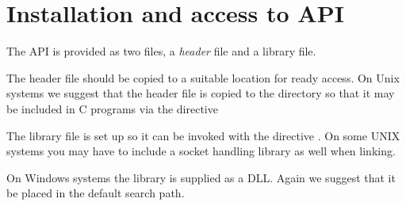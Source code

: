 \chapter{Installation and access to API}
\label{chp:installation-and-access-to-api}
The API is provided as two files, a \textit{header} file  and a library file.

The header file should be copied to a suitable location for ready access.
On Unix systems we suggest that the header file is copied to the directory  so that
it may be included in C programs via the directive 

The library file is set up so it can be invoked with the  directive \exampletext{\libname}.
On some UNIX systems you may have to include a socket handling library as well when linking.

On Windows systems the library is supplied as a DLL. Again we suggest that it be placed in the default search path.


